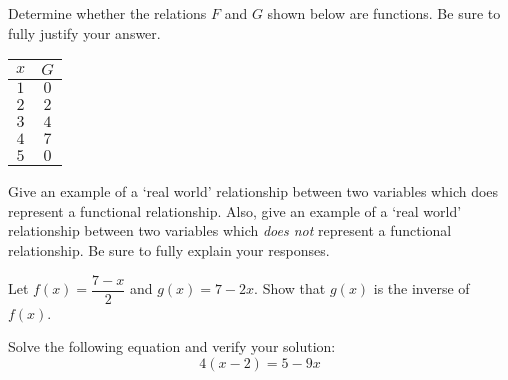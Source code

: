 \documentclass[11pt,letterpaper]{article}
\begin{document}
\prob Determine whether the relations $F$ and $G$ shown below are functions. Be sure to fully justify your answer. \pspace
	\hfill
	\begin{minipage}[c]{0.48\textwidth}
	\end{minipage}%
	\begin{minipage}[c]{0.40\textwidth}
	\begin{table}[H]
	\centering
	\begin{tabular}{cc}
	$x$ & $G$ \\ \hline
	$1$ & $0$ \\
	$2$ & $2$ \\
	$3$ & $4$ \\
	$4$ & $7$ \\
	$5$ & $0$
	\end{tabular}
	\end{table}
	\end{minipage} \pspace


\prob Give an example of a `real world' relationship between two variables which does represent a functional relationship. Also, give an example of a `real world' relationship between two variables which \textit{does not} represent a functional relationship. Be sure to fully explain your responses. \pspace


\prob  Let $f(x)= \dfrac{7 - x}{2}$ and $g(x)= 7 - 2x$. Show that $g(x)$ is the inverse of $f(x)$. \pspace


\prob Solve the following equation and verify your solution:
	\[
	4(x - 2)= 5 - 9x
	\] \pspace
\end{document}
